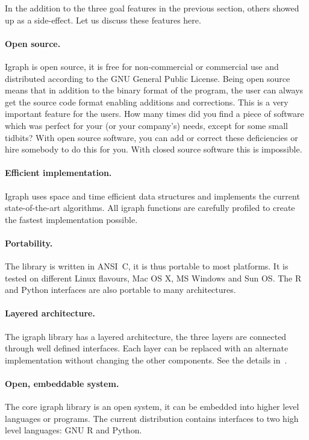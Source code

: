 \documentclass[twoside]{book}%
\begin{document}
In the addition to the three goal features in the previous section,
others showed up as a side-effect. Let us discuss these features here.

\paragraph{Open source.} Igraph is open source, it is free for
non-commercial or commercial use and distributed according to the GNU
General Public License. Being open source means that in addition to
the binary format of the program, the user can
always get the source code format enabling additions and corrections.
This is a very important feature for the users. How many times did you
find a piece of software which was perfect for your (or your
company's) needs, except for some small tidbits? With open source
software, you can add or correct these deficiencies or hire somebody to
do this for you. With closed source software this is impossible.

\paragraph{Efficient implementation.} Igraph uses space and time
efficient data structures and implements the current state-of-the-art
algorithms. All igraph functions are carefully profiled to create the
fastest implementation possible.

\paragraph{Portability.} The library is written in ANSI~C, it is thus
portable to most platforms. It is tested on different Linux flavours,
Mac OS X, MS Windows and Sun OS. The R and Python interfaces are also
portable to many architectures.

\paragraph{Layered architecture.} The igraph library has a layered
architecture, the three layers are connected through well defined
interfaces. Each layer can be replaced with an alternate
implementation without changing the other components. See the details
in~.

\paragraph{Open, embeddable system.} The core igraph library is an
open system, it can be embedded into higher level languages or
programs. The current distribution contains interfaces to two high
level languages: GNU R and Python.
\end{document}
